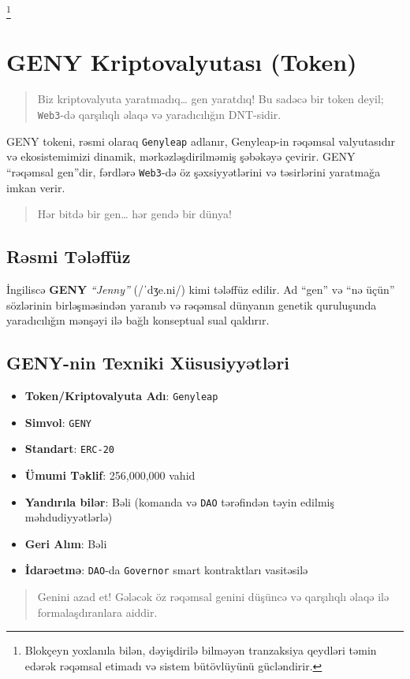 \documentclass[a4paper,12pt,openany]{book}
\begin{document}
\footnote{Blokçeyn yoxlanıla bilən, dəyişdirilə bilməyən tranzaksiya qeydləri təmin edərək rəqəmsal etimadı və sistem bütövlüyünü gücləndirir.}

\chapter{GENY Kriptovalyutası (Token)}
\begin{quote}
Biz kriptovalyuta yaratmadıq… gen yaratdıq! Bu sadəcə bir token deyil; \texttt{Web3}-də qarşılıqlı əlaqə və yaradıcılığın DNT-sidir.
\end{quote}
GENY tokeni, rəsmi olaraq \texttt{Genyleap} adlanır, Genyleap-in rəqəmsal valyutasıdır və ekosistemimizi dinamik, mərkəzləşdirilməmiş şəbəkəyə çevirir. GENY “rəqəmsal gen”dir, fərdlərə \texttt{Web3}-də öz şəxsiyyətlərini və təsirlərini yaratmağa imkan verir.
\begin{quote}
Hər bitdə bir gen… hər gendə bir dünya!
\end{quote}

\section*{Rəsmi Tələffüz}
İngiliscə \textbf{GENY} \textit{``Jenny''} ({\ipafont /ˈdʒe.ni/}) kimi tələffüz edilir. Ad “gen” və “nə üçün” sözlərinin birləşməsindən yaranıb və rəqəmsal dünyanın genetik quruluşunda yaradıcılığın mənşəyi ilə bağlı konseptual sual qaldırır.

\section*{GENY-nin Texniki Xüsusiyyətləri}
\begin{itemize}
    \item \textbf{Token/Kriptovalyuta Adı}: \texttt{Genyleap}
    \item \textbf{Simvol}: \texttt{GENY}
    \item \textbf{Standart}: \texttt{ERC-20}
    \item \textbf{Ümumi Təklif}: 256,000,000 vahid
    \item \textbf{Yandırıla bilər}: Bəli (komanda və \texttt{DAO} tərəfindən təyin edilmiş məhdudiyyətlərlə)
    \item \textbf{Geri Alım}: Bəli
    \item \textbf{İdarəetmə}: \texttt{DAO}-da \texttt{Governor} smart kontraktları vasitəsilə
\end{itemize}
\vspace{-0.5em}
\begin{quote}
Genini azad et! Gələcək öz rəqəmsal genini düşüncə və qarşılıqlı əlaqə ilə formalaşdıranlara aiddir.
\end{quote}
\newpage
\end{document}
